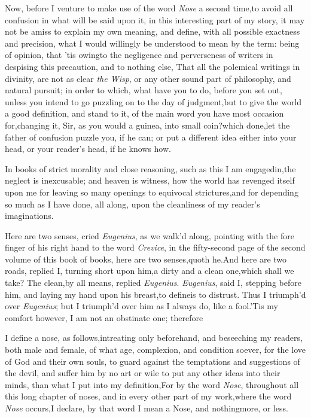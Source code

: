 \documentclass{article}
\begin{document}
Now, before I venture to make use
of the word \textit{Nose} a
second time,\tsk to avoid all confusion in what will be said upon
it, in this interesting part of my story, it may not be amiss to
explain my own meaning, and define, with all possible exactness and
precision, what I would willingly be understood to mean by the
term: being of opinion, that ’tis owing\break to the negligence and
perverseness of writers in despising this precaution, and to
nothing else,\tsh
That all the polemi\-cal writings in divinity, are not as clear
\textit{the Wisp}, or any
other sound part of phi\-losophy, and natural pursuit; in order to
which, what have you to do, before you set out, unless you
intend to go puzzling on to the day of judgment,\tsh but
to\break
give the world a good definition, and stand to it, of the main
word you have most occasion for,\tsh changing it, Sir, as
you would a guinea, into small coin?\tsk which done,\tsk let the
father of confusion puzzle you, if he can; or put a different
idea either into your head, or your reader’s head, if he knows
how.

In books of strict morality and close reasoning, such as this I am
engaged\break in,\tsk the neglect is inexcusable; and hea\-ven is witness,
how the world has re\-venged itself upon me for leaving so many
openings to equivocal strictures,\tsk and for depending so much as
I have done, all along, upon the cleanliness of my reader’s
imaginations.

\tsh Here are two senses, cried \textit{Eu\-genius}, as we walk’d
along, pointing with the fore finger of his right hand to the
word \textit{Crevice}, in the fifty-second page of the second
volume of this book of books,
\tsh here are two senses,\tsk quoth he.\tsk And here are two
roads, replied I, turning short upon him,\tsh a dirty and a
clean one,\tsh which shall we take?\tsk\break
The clean,\tsk by all means, replied \textit{Eu\-genius}.  \textit{Eugenius},
said I, stepping before him, and laying my hand upon his\break
breast,\tsh to define\tsh is to distrust.\tsh\break
Thus I triumph’d over \textit{Eugenius}; but I triumph’d over
him as I always do, like a fool.\tsh ’Tis my comfort however, I
am not an obstinate one; therefore

I define a nose, as follows,\tsh intreat\-ing only beforehand, and
beseeching my readers, both male and female, of what age,
complexion, and condition soever, for the love of God and their own
souls, to guard against the temptations and suggestions of the
devil, and suffer him by no art or wile to put any other
ideas
into their minds, than what I put into my definition,\tsk For by
the word \textit{Nose}, throughout all this long chapter of
noses, and in every other part of my work,\break where the word
\textit{Nose} occurs,\tsk I declare, by that word I mean a Nose,
and nothing\break more, or less.
\end{document}

